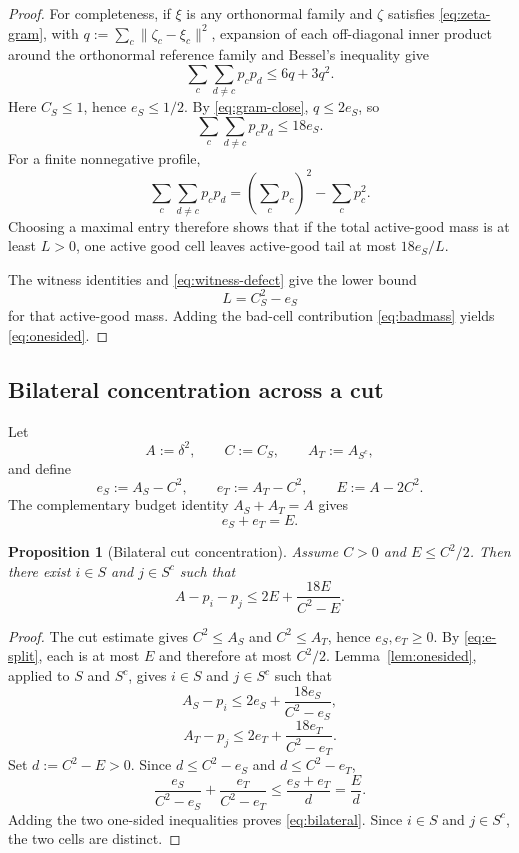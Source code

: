 \documentclass[11pt]{article}
\newtheorem{proposition}[theorem]{Proposition}
\newcommand{\dd}{\delta}
\begin{document}
\begin{proof}
For completeness, if $\xi$ is any orthonormal family and $\zeta$ satisfies
\eqref{eq:zeta-gram}, with
$q:=\sum_c\|\zeta_c-\xi_c\|^2$, expansion of each off-diagonal inner product
around the orthonormal reference family and Bessel's inequality give
\begin{equation}\label{eq:gram-spread-general}
  \sum_c\sum_{d\ne c}p_cp_d
  \le 6q+3q^2.
\end{equation}
Here $C_S\le1$, hence $e_S\le1/2$.  By \eqref{eq:gram-close},
$q\le2e_S$, so
\begin{equation}\label{eq:gram18}
  \sum_c\sum_{d\ne c}p_cp_d\le18e_S.
\end{equation}
For a finite nonnegative profile,
\[
  \sum_c\sum_{d\ne c}p_cp_d
  =
  \left(\sum_cp_c\right)^2-\sum_cp_c^2.
\]
Choosing a maximal entry therefore shows that if the total active-good mass
is at least $L>0$, one active good cell leaves active-good tail at most
$18e_S/L$.

The witness identities and \eqref{eq:witness-defect} give the lower bound
\[
  L=C_S^2-e_S
\]
for that active-good mass.  Adding the bad-cell contribution
\eqref{eq:badmass} yields \eqref{eq:onesided}.
\end{proof}

\subsection{Bilateral concentration across a cut}

Let
\[
  A:=\dd^2,\qquad C:=C_S,\qquad
  A_T:=A_{S^c},
\]
and define
\[
  e_S:=A_S-C^2,\qquad
  e_T:=A_T-C^2,\qquad
  E:=A-2C^2.
\]
The complementary budget identity $A_S+A_T=A$ gives
\begin{equation}\label{eq:e-split}
  e_S+e_T=E.
\end{equation}

\begin{proposition}[Bilateral cut concentration]\label{prop:bilateral}
Assume $C>0$ and $E\le C^2/2$.  Then there exist
$i\in S$ and $j\in S^c$ such that
\begin{equation}\label{eq:bilateral}
  A-p_i-p_j
  \le
  2E+\frac{18E}{C^2-E}.
\end{equation}
\end{proposition}

\begin{proof}
The cut estimate gives $C^2\le A_S$ and $C^2\le A_T$, hence
$e_S,e_T\ge0$.  By \eqref{eq:e-split}, each is at most $E$ and therefore at
most $C^2/2$.  Lemma~\ref{lem:onesided}, applied to $S$ and $S^c$, gives
$i\in S$ and $j\in S^c$ such that
\[
  A_S-p_i
  \le
  2e_S+\frac{18e_S}{C^2-e_S},
\]
\[
  A_T-p_j
  \le
  2e_T+\frac{18e_T}{C^2-e_T}.
\]
Set $d:=C^2-E>0$.  Since
$d\le C^2-e_S$ and $d\le C^2-e_T$,
\[
  \frac{e_S}{C^2-e_S}
  +
  \frac{e_T}{C^2-e_T}
  \le
  \frac{e_S+e_T}{d}
  =
  \frac Ed.
\]
Adding the two one-sided inequalities proves
\eqref{eq:bilateral}.  Since $i\in S$ and $j\in S^c$, the two cells are
distinct.
\end{proof}
\end{document}
